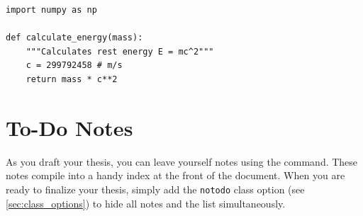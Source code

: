 \begin{listing}[htpb]
    \begin{verbatim}
import numpy as np

def calculate_energy(mass):
    """Calculates rest energy E = mc^2"""
    c = 299792458 # m/s
    return mass * c**2
\end{verbatim}
    \caption{A simple Python script demonstrating the \texttt{minted} configuration.}
    \label{lst:python}
\end{listing}

\section{To-Do Notes}
As you draft your thesis, you can leave yourself notes using the \texttt{\todo{}} command.
These notes compile into a handy index at the front of the document. When you are ready to finalize your thesis, simply add the \texttt{notodo} class option (see \cref{sec:class_options}) to hide all notes and the list simultaneously.
